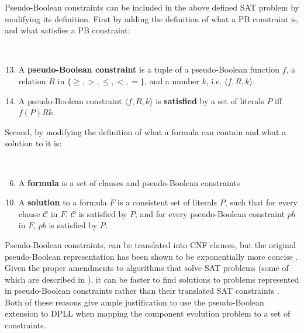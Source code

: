 Pseudo-Boolean constraints can be included in the above defined SAT problem by modifying its definition.
First by adding the definition of what a PB constraint is, and what satisfies a PB constraint:
\begin{defs}
{\ }
\begin{enumerate}
\setcounter{enumi}{12}
  \item A \textbf{pseudo-Boolean constraint} is a tuple of a pseudo-Boolean function $f$, a relation $R$ in $\{\geq,>,\leq,<,=\}$, and a number $k$, i.e. $\langle f,R,k\rangle$.
  \item A pseudo-Boolean constraint $\langle f,R,k\rangle$ is \textbf{satisfied} by a set of literals $P$ iff $ f(P) R k$.
\end{enumerate}
\end{defs}

Second, by modifying the definition of what a formula can contain and what a solution to it is:
\begin{defs}
{\ }
\begin{enumerate}
\setcounter{enumi}{5}
    \item A \textbf{formula} is a set of clauses and pseudo-Boolean constraints
\end{enumerate}
\begin{enumerate}
\setcounter{enumi}{9}
    \item A \textbf{solution} to a formula $F$ is a consistent set of literals $P$, such that for every clause $\mathcal{C}$ in $F$, $\mathcal{C}$ is satisfied by $P$,
    and for every pseudo-Boolean constraint $pb$ in $F$, $pb$ is satisfied by $P$. 
\end{enumerate}
\end{defs}

Pseudo-Boolean constraints, can be translated into CNF clauses, but the original pseudo-Boolean representation has been shown to be exponentially more concise \citep{dixon2004automating}.
Given the proper amendments to algorithms that solve SAT problems (some of which are described in \citep{Sheini2006}), 
it can be faster to find solutions to problems represented in pseudo-Boolean constraints rather than their translated SAT constraints \citep{dixon2004automating}.
Both of these reasons give ample justification to use the pseudo-Boolean extension to DPLL when mapping the component evolution problem to a set of constraints. 

